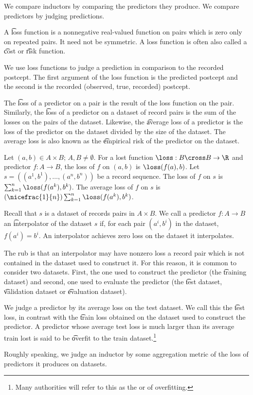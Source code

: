 

We compare inductors by comparing the predictors they produce.
We compare predictors by judging predictions.


A \t{loss} function is a nonnegative real-valued function on pairs which is zero only on repeated pairs.
It need not be symmetric.
A loss function is often also called a \t{cost} or \t{risk} function.

We use loss functions to judge a prediction in comparison to the recorded postcept.
The first argument of the loss function is the predicted postcept and the second is the recorded (observed, true, recorded) postcept.

The \t{loss of a predictor on a pair} is the result of the loss function on the pair.
Similarly, the \t{loss of a predictor on a dataset} of record pairs is the sum of the losses on the pairs of the dataset.
Likewise, the \t{average loss} of a predictor is the loss of the predictor on the dataset divided by the size of the dataset.
The average loss is also known as the \t{empirical risk} of the predictor on the dataset.


Let $(a, b) \in A \times B$; $A, B \neq \emptyset$.
For a lost function $\loss: B \cross B \to \R$ and predictor $f: A \to B$, the loss of $f$ on $(a, b)$ is $\loss(f(a),b)$.
Let $s = ((a^1, b^1), \dots, (a^n, b^n))$
be a record sequence.
The loss of $f$ on $s$ is $\sum_{k = 1}^{n} \loss(f(a^k), b^k)$.
The average loss of $f$ on $s$ is $(\nicefrac{1}{n})\sum_{k = 1}^{n} \loss(f(a^k), b^k)$.


Recall that $s$ is a dataset of records pairs in $A \times B$.
We call a predictor $f: A \to B$ an \t{interpolator} of the dataset $s$ if, for each pair $(a^i, b^i)$ in the dataset, $f(a^i) = b^i$.
An interpolator achieves zero loss on the dataset it interpolates.

The rub is that an interpolator may have nonzero loss a record pair which is not contained in the dataset used to construct it.
For this reason, it is common to consider two datasets.
First, the one used to construct the predictor (the \t{training dataset}) and second, one used to evaluate the predictor (the \t{test dataset}, \t{validation dataset} or \t{evaluation dataset}).

We judge a predictor by its average loss on the test dataset.
We call this the \t{test loss}, in contrast with the \t{train loss} obtained on the dataset used to construct the predictor.
A predictor whose average test loss is much larger than its average train lost is said to be \t{overfit} to the train dataset.\footnote{Many authorities will refer to this as the  or  of overfitting.}

Roughly speaking, we judge an inductor by some aggregation metric of the loss of predictors it produces on datasets.
